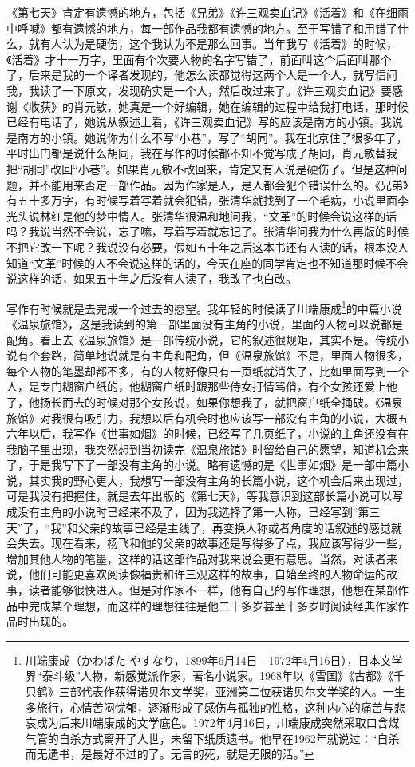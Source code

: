 \documentclass[12pt,a5paper]{ctexbook}
\begin{document}
《第七天》肯定有遗憾的地方，包括《兄弟》《许三观卖血记》《活着》和《在细雨中呼喊》都有遗憾的地方，每一部作品我都有遗憾的地方。至于写错了和用错了什么，就有人认为是硬伤，这个我认为不是那么回事。当年我写《活着》的时候，《活着》才十一万字，里面有个次要人物的名字写错了，前面叫这个后面叫那个了，后来是我的一个译者发现的，他怎么读都觉得这两个人是一个人，就写信问我，我读了一下原文，发现确实是一个人，然后改过来了。《许三观卖血记》要感谢《收获》的肖元敏，她真是一个好编辑，她在编辑的过程中给我打电话，那时候已经有电话了，她说从叙述上看，《许三观卖血记》写的应该是南方的小镇。我说是南方的小镇。她说你为什么不写“小巷”，写了“胡同”。我在北京住了很多年了，平时出门都是说什么胡同，我在写作的时候都不知不觉写成了胡同，肖元敏替我把“胡同”改回“小巷”。如果肖元敏不改回来，肯定又有人说是硬伤了。但是这种问题，并不能用来否定一部作品。因为作家是人，是人都会犯个错误什么的。《兄弟》有五十多万字，有时候写着写着就会犯错，张清华就找到了一个毛病，小说里面李光头说林红是他的梦中情人。张清华很温和地问我，“文革”的时候会说这样的话吗？我说当然不会说，忘了嘛，写着写着就忘记了。张清华问我为什么再版的时候不把它改一下呢？我说没有必要，假如五十年之后这本书还有人读的话，根本没人知道“文革”时候的人不会说这样的话的，今天在座的同学肯定也不知道那时候不会说这样的话，如果五十年之后没有人读了，我改了也白改。

写作有时候就是去完成一个过去的愿望。我年轻的时候读了川端康成\footnote{川端康成（かわばた やすなり，1899年6月14日—1972年4月16日），日本文学界“泰斗级”人物，新感觉派作家，著名小说家。1968年以《雪国》《古都》《千只鹤》三部代表作获得诺贝尔文学奖，亚洲第二位获诺贝尔文学奖的人。一生多旅行，心情苦闷忧郁，逐渐形成了感伤与孤独的性格，这种内心的痛苦与悲哀成为后来川端康成的文学底色。1972年4月16日，川端康成突然采取口含煤气管的自杀方式离开了人世，未留下纸质遗书。他早在1962年就说过：“自杀而无遗书，是最好不过的了。无言的死，就是无限的活。”}的中篇小说《温泉旅馆》，这是我读到的第一部里面没有主角的小说，里面的人物可以说都是配角。看上去《温泉旅馆》是一部传统小说，它的叙述很规矩，其实不是。传统小说有个套路，简单地说就是有主角和配角，但《温泉旅馆》不是，里面人物很多，每个人物的笔墨却都不多，有的人物好像只有一页纸就消失了，比如里面写到一个人，是专门糊窗户纸的，他糊窗户纸时跟那些侍女打情骂俏，有个女孩还爱上他了，他扬长而去的时候对那个女孩说，如果你想我了，就把窗户纸全捅破。《温泉旅馆》对我很有吸引力，我想以后有机会时也应该写一部没有主角的小说，大概五六年以后，我写作《世事如烟》的时候，已经写了几页纸了，小说的主角还没有在我脑子里出现，我突然想到当初读完《温泉旅馆》时留给自己的愿望，知道机会来了，于是我写下了一部没有主角的小说。略有遗憾的是《世事如烟》是一部中篇小说，其实我的野心更大，我想写一部没有主角的长篇小说，这个机会后来出现过，可是我没有把握住，就是去年出版的《第七天》，等我意识到这部长篇小说可以写成没有主角的小说时已经来不及了，因为我选择了第一人称，已经写到“第三天”了，“我”和父亲的故事已经是主线了，再变换人称或者角度的话叙述的感觉就会失去。现在看来，杨飞和他的父亲的故事还是写得多了点，我应该写得少一些，增加其他人物的笔墨，这样的话这部作品对我来说会更有意思。当然，对读者来说，他们可能更喜欢阅读像福贵和许三观这样的故事，自始至终的人物命运的故事，读者能够很快进入。但是对作家不一样，他有自己的写作理想，他想在某部作品中完成某个理想，而这样的理想往往是他二十多岁甚至十多岁时阅读经典作家作品时出现的。
\end{document}
